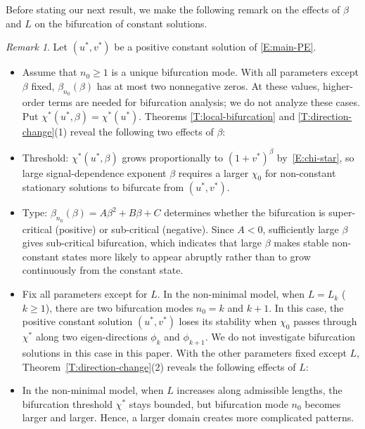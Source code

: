 \documentclass[11pt]{article} %
\theoremstyle{remark}
\newtheorem{remark}{Remark}[section]
\theoremstyle{remark}
\numberwithin{equation}{section}
\numberwithin{figure}{section}
\numberwithin{table}{section}
\begin{document}
Before stating our next result, we make the following remark on the effects of
$\beta$ and $L$ on the bifurcation of constant solutions.


\begin{remark}
  Let $(u^*,v^*)$ be a positive constant solution of \eqref{E:main-PE}.
  \begin{itemize}
    \item[(1)] Assume that $n_0 \ge 1$ is  a unique bifurcation mode.
      With all parameters except $\beta$ fixed, $\beta_{n_0}(\beta)$ has at most
      two nonnegative zeros. At these values, higher-order terms are needed for
      bifurcation analysis; we do not analyze these cases. Put
      $\chi^*(u^*,\beta) = \chi^*(u^*)$. Theorems \ref{T:local-bifurcation}
      and \ref{T:direction-change}(1)
      reveal the following two effects of $\beta$:
    \item[-] {Threshold:} $\chi^*(u^*,\beta)$ grows proportionally to $(1 +
      v^*)^\beta$ by~\eqref{E:chi-star}, so  large signal-dependence exponent $\beta$
      requires a
      larger $\chi_0$ for non-constant stationary solutions to bifurcate from $(u^*,v^*)$.
    \item[-] {Type:} $\beta_{n_0}(\beta) = A\beta^2 + B\beta + C$ determines
      whether the bifurcation is super-critical (positive) or sub-critical
      (negative). Since $A < 0$, sufficiently large $\beta$ gives sub-critical
      bifurcation, which indicates that large $\beta$ makes stable non-constant
      states more likely to appear abruptly rather than to grow continuously
      from the constant state.


    \item[(2)] Fix all parameters except for $L$. In the non-minimal model, when
      $L = L_k$ ($k \ge 1$), there are two bifurcation modes {$n_0=k$ and $k +
      1$.}  In this case, the positive constant solution $(u^*,v^*)$ loses its
      stability when $\chi_0$ passes through $\chi^*$ along two eigen-directions
      $\phi_{k}$ and $\phi_{k+1}$. We do not investigate bifurcation solutions
      in this case in this paper. With the other parameters fixed except $L$,
      Theorem~\ref{T:direction-change}(2) reveals the following effects of $L$:


    \item[-] In the non-minimal model, when $L$ increases along admissible lengths, the bifurcation
      threshold $\chi^*$ stays bounded, but bifurcation mode $n_0$ becomes
      larger and larger. Hence, a larger domain creates more complicated
      patterns.


\end{itemize}
\end{remark}
\end{document}
